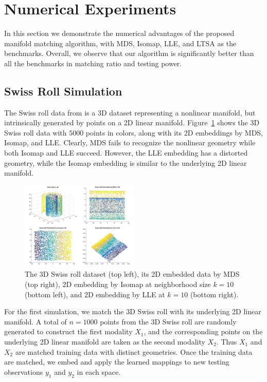 \documentclass[times,twocolumn,final]{elsarticle}
\begin{document}
\section{Numerical Experiments}
\label{numer}
In this section we demonstrate the numerical advantages of the proposed manifold matching algorithm, with MDS, Isomap, LLE, and LTSA as the benchmarks. Overall, we observe that our algorithm is significantly better than all the benchmarks in matching ratio and testing power. 

\subsection{Swiss Roll Simulation}
The Swiss roll data from \citep{TenenbaumSilvaLangford2000} is a 3D dataset representing a nonlinear manifold, but intrinsically generated by points on a 2D linear manifold. Figure~\ref{fig1} shows the 3D Swiss roll data with $5000$ points in colors, along with its 2D embeddings by MDS, Isomap, and LLE. Clearly, MDS fails to recognize the nonlinear geometry while both Isomap and LLE succeed. However, the LLE embedding has a distorted geometry, while the Isomap embedding is similar to the underlying 2D linear manifold.

\begin{figure}[htbp]
\centering
\includegraphics[width=0.5\textwidth]{../Figures/Swiss}
\caption{The 3D Swiss roll dataset (top left), its 2D embedded data by MDS (top right), 2D embedding by Isomap at neighborhood size $k=10$ (bottom left), and 2D embedding by LLE at $k=10$ (bottom right).}
\label{fig1}
\end{figure}

For the first simulation, we match the 3D Swiss roll with its underlying 2D linear manifold. A total of $n=1000$ points from the 3D Swiss roll are randomly generated to construct the first modality $X_{1}$, and the corresponding points on the underlying 2D linear manifold are taken as the second modality $X_{2}$. Thus $X_{1}$ and $X_{2}$ are matched training data with distinct geometries. Once the training data are matched, we embed and apply the learned mappings to new testing observations $y_{1}$ and $y_{2}$ in each space.
\end{document}
